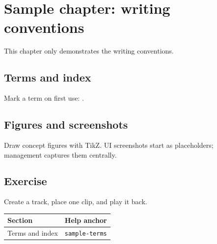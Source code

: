 \chapter{Sample chapter: writing conventions}
\label{ch:sample}

This chapter only demonstrates the writing conventions.

\section{Terms and index}
Mark a term on first use: .

\section{Figures and screenshots}
Draw concept figures with TikZ. UI screenshots start as placeholders;
management captures them centrally.


\section{Exercise}
\begin{exercise}
Create a track, place one clip, and play it back.
\end{exercise}

\begin{helpmapping}
\begin{longtable}{ll}
\toprule
Section & Help anchor \\
\midrule
Terms and index & \texttt{sample-terms} \\
\bottomrule
\end{longtable}
\end{helpmapping}
